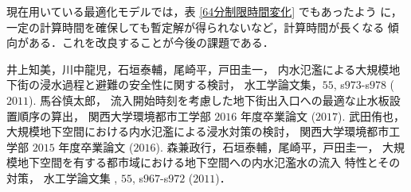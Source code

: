 \documentclass[a4paper,10pt]{jarticle}
\begin{document}
現在用いている最適化モデルでは，表 \ref{64分制限時間変化} でもあったよう
に，一定の計算時間を確保しても暫定解が得られないなど，計算時間が長くなる
傾向がある．これを改良することが今後の課題である．

{\footnotesize
\begin{thebibliography}{9}
 \setlength{\parskip}{0cm} %
 \setlength{\itemsep}{0cm} %
	 井上知美，川中龍児，石垣泰輔，尾崎平，戸田圭一，
	 内水氾濫による大規模地下街の浸水過程と避難の安全性に関する検討，
	 水工学論文集，$55$, s$973$-s$978$ ($2011$).
	 馬谷慎太郎，
	 流入開始時刻を考慮した地下街出入口への最適な止水板設
	 置順序の算出，
	 関西大学環境都市工学部 $2016$ 年度卒業論文 ($2017$).
	 武田侑也，
	 大規模地下空間における内水氾濫による浸水対策の検討，
	 関西大学環境都市工学部 $2015$ 年度卒業論文 ($2016$).
	 森兼政行，石垣泰輔，尾崎平，戸田圭一，
	 大規模地下空間を有する都市域における地下空間への内水氾濫水の流入
	 特性とその対策，
	 水工学論文集 , $55$, s$967$-s$972$ ($2011$)．
\end{thebibliography}
}
\end{document}
